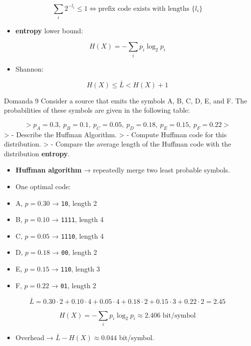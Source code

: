 $$
\sum_i 2^{-l_i} \le 1
\iff
\text{prefix code exists with lengths } \{l_i\}
$$


\begin{itemize}
  \item \textbf{entropy} lower bound:
\end{itemize}


$$
H(X)=-\sum_i p_i \log_2 p_i
$$


\begin{itemize}
  \item Shannon:
\end{itemize}


$$
H(X) \le \bar{L} < H(X)+1
$$




\begin{questionbox}{Domanda 9}
Consider a source that emits the symbols A, B, C, D, E, and F. The probabilities of these symbols are given in the following table:
\end{questionbox}

$$
> p_A=0.3,\ p_B=0.1,\ p_C=0.05,\ p_D=0.18,\ p_E=0.15,\ p_F=0.22
> $$
> - Describe the Huffman Algorithm.
> - Compute Huffman code for this distribution.
> - Compare the average length of the Huffman code with the distribution \textbf{entropy}.

\begin{itemize}
  \item \textbf{Huffman algorithm} → repeatedly merge two least probable symbols.
  \item One optimal code:
  \item A, $p=0.30$ → \texttt{10}, length 2
  \item B, $p=0.10$ → \texttt{1111}, length 4
  \item C, $p=0.05$ → \texttt{1110}, length 4
  \item D, $p=0.18$ → \texttt{00}, length 2
  \item E, $p=0.15$ → \texttt{110}, length 3
  \item F, $p=0.22$ → \texttt{01}, length 2
\end{itemize}


$$
\bar{L}=0.30\cdot2+0.10\cdot4+0.05\cdot4+0.18\cdot2+0.15\cdot3+0.22\cdot2 = 2.45
$$



$$
H(X)=-\sum_i p_i\log_2 p_i \approx 2.406 \text{ bit/symbol}
$$


\begin{itemize}
  \item Overhead → $\bar{L}-H(X)\approx0.044$ bit/symbol.
\end{itemize}



